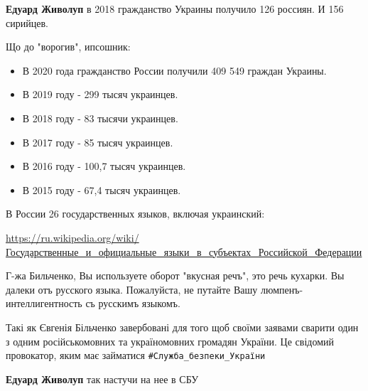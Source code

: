 \begin{itemize}
\begin{itemize}

\textbf{Едуард Живолуп} в 2018 гражданство Украины получило 126 россиян. И 156 сирийцев.

Що до "ворогив", ипсошник:

\begin{itemize}
  \item В 2020 года гражданство России получили 409 549 граждан Украины.
  \item В 2019 году - 299 тысяч украинцев.
  \item В 2018 году - 83 тысячи украинцев.
  \item В 2017 году - 85 тысяч украинцев.
  \item В 2016 году - 100,7 тысяч украинцев.
  \item В 2015 году - 67,4 тысяч украинцев.
\end{itemize}

В России 26 государственных языков, включая украинский:\par
\url{https://ru.wikipedia.org/wiki/Государственные_и_официальные_языки_в_субъектах_Российской_Федерации}

\end{itemize}


Г-жа Бильченко, Вы используете оборот "вкусная речъ", это речь кухарки. Вы
далеки отъ русского языка. Пожалуйста, не путайте Вашу люмпенъ-интеллигентность
съ русскимъ языкомъ.


Такі як Євгенія Більченко завербовані для того щоб своїми заявами сварити один
з одним російськомовних та україномовних громадян України. Це свідомий
провокатор, яким має займатися \verb|#Служба_безпеки_України|

\begin{itemize}

\textbf{Едуард Живолуп} так настучи на нее в СБУ



\end{itemize}
\end{itemize}
